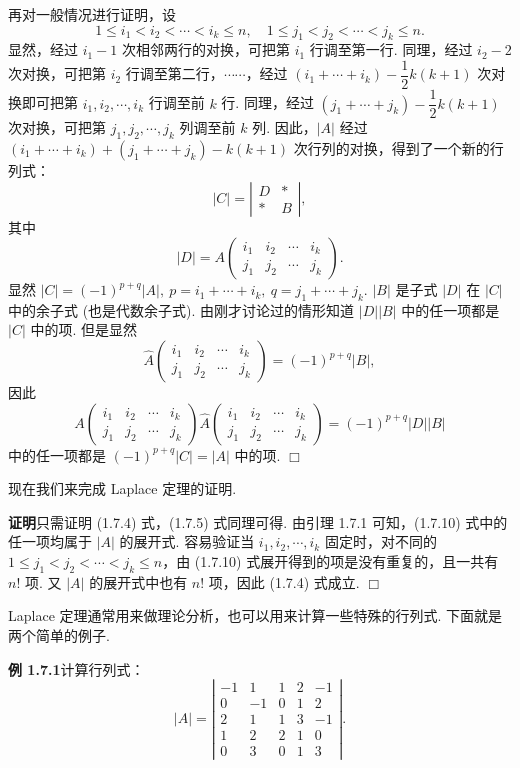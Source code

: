 \documentclass[UTF8,12pt,a4paper,fontset=fandol]{ctexart}
\begin{document}
再对一般情况进行证明，设
\[
1\le i_1<i_2<\cdots<i_k\le n,\quad 1\le j_1<j_2<\cdots<j_k\le n.
\]
显然，经过 $i_1-1$ 次相邻两行的对换，可把第 $i_1$ 行调至第一行. 同理，经过 $i_2-2$ 次对换，可把第 $i_2$ 行调至第二行，$\cdots\cdots$，经过 $(i_1+\cdots+i_k)-\dfrac{1}{2}k(k+1)$ 次对换即可把第 $i_1,i_2,\cdots,i_k$ 行调至前 $k$ 行. 同理，经过 $(j_1+\cdots+j_k)-\dfrac{1}{2}k(k+1)$ 次对换，可把第 $j_1,j_2,\cdots,j_k$ 列调至前 $k$ 列. 因此，$|A|$ 经过 $(i_1+\cdots+i_k)+(j_1+\cdots+j_k)-k(k+1)$ 次行列的对换，得到了一个新的行列式：
\[
|C|=\left|\begin{array}{cc}
D&*\\
*&B
\end{array}\right|,
\]
其中
\[
|D|=A\left(\begin{array}{cccc}
i_1&i_2&\cdots&i_k\\
j_1&j_2&\cdots&j_k
\end{array}\right).
\]
显然 $|C|=(-1)^{p+q}|A|,\ p=i_1+\cdots+i_k,\ q=j_1+\cdots+j_k$. $|B|$ 是子式 $|D|$ 在 $|C|$ 中的余子式 (也是代数余子式). 由刚才讨论过的情形知道 $|D||B|$ 中的任一项都是 $|C|$ 中的项. 但是显然
\[
\widehat{A}\left(\begin{array}{cccc}
i_1&i_2&\cdots&i_k\\
j_1&j_2&\cdots&j_k
\end{array}\right)=(-1)^{p+q}|B|,
\]
因此
\begin{equation}
A\left(\begin{array}{cccc}
i_1&i_2&\cdots&i_k\\
j_1&j_2&\cdots&j_k
\end{array}\right)
\widehat{A}\left(\begin{array}{cccc}
i_1&i_2&\cdots&i_k\\
j_1&j_2&\cdots&j_k
\end{array}\right)
=(-1)^{p+q}|D||B|
\tag{1.7.10}
\end{equation}
中的任一项都是 $(-1)^{p+q}|C|=|A|$ 中的项. $\Box$

现在我们来完成 Laplace 定理的证明.

\noindent\textbf{证明}\quad 只需证明 (1.7.4) 式，(1.7.5) 式同理可得. 由引理 1.7.1 可知，(1.7.10) 式中的任一项均属于 $|A|$ 的展开式. 容易验证当 $i_1,i_2,\cdots,i_k$ 固定时，对不同的 $1\le j_1<j_2<\cdots<j_k\le n$，由 (1.7.10) 式展开得到的项是没有重复的，且一共有 $n!$ 项. 又 $|A|$ 的展开式中也有 $n!$ 项，因此 (1.7.4) 式成立. $\Box$

Laplace 定理通常用来做理论分析，也可以用来计算一些特殊的行列式. 下面就是两个简单的例子.

\noindent\textbf{例 1.7.1}\quad 计算行列式：
\[
|A|=
\left|\begin{array}{rrrrr}
-1&1&1&2&-1\\
0&-1&0&1&2\\
2&1&1&3&-1\\
1&2&2&1&0\\
0&3&0&1&3
\end{array}\right|.
\]
\end{document}
